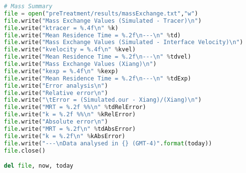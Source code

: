 \begin{lstlisting}[language=python]
# Mass Summary
file = open("preTreatment/results/massExchange.txt","w")
file.write("Mass Exchange Values (Simulated - Tracer)\n")
file.write("ktracer = %.4f\n" %k)
file.write("Mean Residence Time = %.2f\n---\n" %td)
file.write("Mass Exchange Values (Simulated - Interface Velocity)\n")
file.write("kvelocity = %.4f\n" %kvel)
file.write("Mean Residence Time = %.2f\n---\n" %tdvel)
file.write("Mass Exchange Values (Xiang)\n")
file.write("kexp = %.4f\n" %kexp)
file.write("Mean Residence Time = %.2f\n---\n" %tdExp)
file.write("Error analysis\n")
file.write("Relative error\n")
file.write("\tError = (Simulated.our - Xiang)/(Xiang)\n")
file.write("MRT = %.2f %%\n" %tdRelError)
file.write("k = %.2f %%\n" %kRelError)
file.write("Absolute error\n")
file.write("MRT = %.2f\n" %tdAbsError)
file.write("k = %.2f\n" %kAbsError)
file.write("---\nData analysed in {} (GMT-4)".format(today))
file.close()

del file, now, today

\end{lstlisting}
